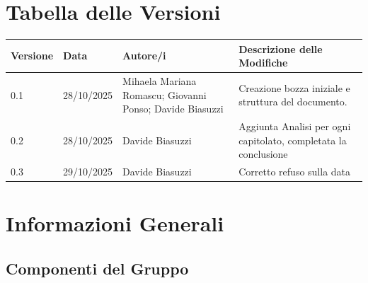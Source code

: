 \documentclass[a4paper, 11pt, oneside]{scrartcl} %
\begin{document}
\newpage
\pagestyle{fancy}
\section*{Tabella delle Versioni}
\vspace{0.2cm} 
\begin{center}
\renewcommand{\arraystretch}{1.2}
\begin{tabular}{@{}llp{}p{}@{}} 
\toprule
\textbf{Versione} & \textbf{Data} & \textbf{Autore/i} & \textbf{Descrizione delle Modifiche} \\
\midrule
0.1 & 28/10/2025 &Mihaela Mariana Romascu; Giovanni Ponso; Davide Biasuzzi & Creazione bozza iniziale e struttura del documento. \\
0.2 & 28/10/2025 & Davide Biasuzzi & Aggiunta Analisi per ogni capitolato, completata la conclusione \\
0.3 & 29/10/2025 & Davide Biasuzzi & Corretto refuso sulla data \\
\bottomrule
\end{tabular}
\end{center}




\newpage
\tableofcontents %
\pagestyle{fancy} %


\newpage
\section{Informazioni Generali}

\subsection{Componenti del Gruppo}
\end{document}
